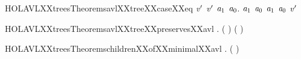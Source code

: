 \begin{SaveVerbatim}{HOLAVLXXtreesTheoremsavlXXtreeXXcaseXXeq}
\HOLTokenTurnstile{}     \HOLSymConst{=} \ensuremath{\HOLFreeVar{v}\sp{\prime{}}} \HOLSymConst{\HOLTokenEquiv{}}
    \HOLSymConst{=}  \HOLSymConst{\HOLTokenConj{}}  \HOLSymConst{=} \ensuremath{\HOLFreeVar{v}\sp{\prime{}}} \HOLSymConst{\HOLTokenDisj{}}
   \HOLSymConst{\HOLTokenExists{}}  \ensuremath{\HOLBoundVar{a}\sb{\mathrm{1}}}  \ensuremath{\HOLBoundVar{a}\sb{\mathrm{0}}}.  \HOLSymConst{=}    \ensuremath{\HOLBoundVar{a}\sb{\mathrm{1}}}  \ensuremath{\HOLBoundVar{a}\sb{\mathrm{0}}} \HOLSymConst{\HOLTokenConj{}}    \ensuremath{\HOLBoundVar{a}\sb{\mathrm{1}}}  \ensuremath{\HOLBoundVar{a}\sb{\mathrm{0}}} \HOLSymConst{=} \ensuremath{\HOLFreeVar{v}\sp{\prime{}}}
\end{SaveVerbatim}
\newcommand{\HOLAVLXXtreesTheoremsavlXXtreeXXcaseXXeq}{\UseVerbatim{HOLAVLXXtreesTheoremsavlXXtreeXXcaseXXeq}}
\begin{SaveVerbatim}{HOLAVLXXtreesTheoremsavlXXtreeXXpreservesXXavl}
\HOLTokenTurnstile{} \HOLSymConst{\HOLTokenForall{}}   .
       \HOLSymConst{\HOLTokenConj{}}   \HOLSymConst{\HOLTokenConj{}}
     (  \HOLSymConst{=}   \HOLSymConst{\HOLTokenDisj{}}   \HOLSymConst{=}   \HOLSymConst{\ensuremath{+}}  \HOLSymConst{\HOLTokenDisj{}}
        \HOLSymConst{=}   \HOLSymConst{\ensuremath{+}} ) \HOLSymConst{\HOLTokenImp{}}
      (    )
\end{SaveVerbatim}
\newcommand{\HOLAVLXXtreesTheoremsavlXXtreeXXpreservesXXavl}{\UseVerbatim{HOLAVLXXtreesTheoremsavlXXtreeXXpreservesXXavl}}
\begin{SaveVerbatim}{HOLAVLXXtreesTheoremschildrenXXofXXminimalXXavl}
\HOLTokenTurnstile{} \HOLSymConst{\HOLTokenForall{}}    .
      (     ) \HOLSymConst{\HOLTokenImp{}}
       \HOLSymConst{\HOLTokenConj{}}  
\end{SaveVerbatim}
